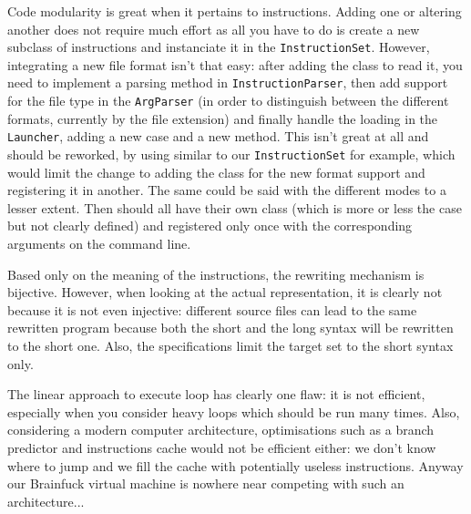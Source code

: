 \documentclass{article}
\begin{document}
\newpage

Code modularity is great when it pertains to instructions. Adding one or altering another does not require much effort as all you have to do is create a new subclass of instructions and instanciate it in the \texttt{InstructionSet}. However, integrating a new file format isn't that easy: after adding the class to read it, you need to implement a parsing method in \texttt{InstructionParser}, then add support for the file type in the \texttt{ArgParser} (in order to distinguish between the different formats, currently by the file extension) and finally handle the loading in the \texttt{Launcher}, adding a new case and a new method. This isn't great at all and should be reworked, by using similar to our \texttt{InstructionSet} for example, which would limit the change to adding the class for the new format support and registering it in another. The same could be said with the different modes to a lesser extent. Then should all have their own class (which is more or less the case but not clearly defined) and registered only once with the corresponding arguments on the command line.

Based only on the meaning of the instructions, the rewriting mechanism is bijective. However, when looking at the actual representation, it is clearly not because it is not even injective: different source files can lead to the same rewritten program because both the short and the long syntax will be rewritten to the short one. Also, the specifications limit the target set to the short syntax only.

The linear approach to execute loop has clearly one flaw: it is not efficient, especially when you consider heavy loops which should be run many times. Also, considering a modern computer architecture, optimisations such as a branch predictor and instructions cache would not be efficient either: we don't know where to jump and we fill the cache with potentially useless instructions. Anyway our Brainfuck virtual machine is nowhere near competing with such an architecture...
\end{document}
